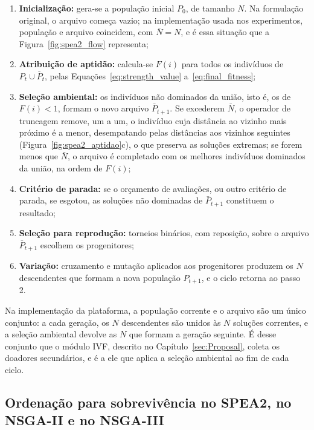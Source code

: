 \begin{enumerate}
    \item \textbf{Inicialização:} gera-se a população inicial $P_0$, de tamanho $N$. Na formulação original, o arquivo começa vazio; na implementação usada nos experimentos, população e arquivo coincidem, com $\bar{N} = N$, e é essa situação que a Figura~\ref{fig:spea2_flow} representa;

    \item \textbf{Atribuição de aptidão:} calcula-se $F(i)$ para todos os indivíduos de $P_t \cup \bar{P}_t$, pelas Equações~\ref{eq:strength_value} a~\ref{eq:final_fitness};

    \item \textbf{Seleção ambiental:} os indivíduos não dominados da união, isto é, os de $F(i) < 1$, formam o novo arquivo $\bar{P}_{t+1}$. Se excederem $\bar{N}$, o operador de truncagem remove, um a um, o indivíduo cuja distância ao vizinho mais próximo é a menor, desempatando pelas distâncias aos vizinhos seguintes (Figura~\ref{fig:spea2_aptidao}c), o que preserva as soluções extremas; se forem menos que $\bar{N}$, o arquivo é completado com os melhores indivíduos dominados da união, na ordem de $F(i)$;

    \item \textbf{Critério de parada:} se o orçamento de avaliações, ou outro critério de parada, se esgotou, as soluções não dominadas de $\bar{P}_{t+1}$ constituem o resultado;

    \item \textbf{Seleção para reprodução:} torneios binários, com reposição, sobre o arquivo $\bar{P}_{t+1}$ escolhem os progenitores;

    \item \textbf{Variação:} cruzamento e mutação aplicados aos progenitores produzem os $N$ descendentes que formam a nova população $P_{t+1}$, e o ciclo retorna ao passo 2.
\end{enumerate}

Na implementação da plataforma, a população corrente e o arquivo são um único conjunto: a cada geração, os $N$ descendentes são unidos às $N$ soluções correntes, e a seleção ambiental devolve as $N$ que formam a geração seguinte. É desse conjunto que o módulo IVF, descrito no Capítulo~\ref{sec:Proposal}, coleta os doadores secundários, e é a ele que aplica a seleção ambiental ao fim de cada ciclo.

\subsection{Ordenação para sobrevivência no SPEA2, no NSGA-II e no NSGA-III}

